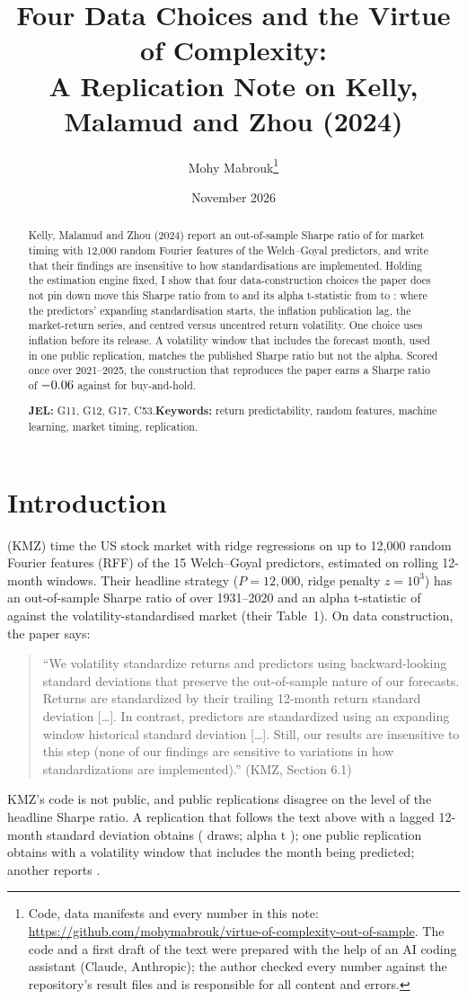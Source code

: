 \documentclass[11pt]{article}
\title{Four Data Choices and the Virtue of Complexity:\\ A Replication Note on Kelly, Malamud and Zhou (2024)}
\author{Mohy Mabrouk\thanks{Code, data manifests and every number in this note:
\url{https://github.com/mohymabrouk/virtue-of-complexity-out-of-sample}. The code and a first draft of the text were
prepared with the help of an AI coding assistant (Claude, Anthropic); the author checked every number against the
repository's result files and is responsible for all content and errors.}}
\date{November 2026}
\begin{document}
\maketitle

\begin{abstract}
\noindent Kelly, Malamud and Zhou (2024) report an out-of-sample Sharpe ratio of \nKmzSR{} for market timing
with 12{,}000 random Fourier features of the Welch--Goyal predictors, and write that their findings are insensitive
to how standardisations are implemented. Holding the estimation engine fixed, I show that four data-construction
choices the paper does not pin down move this Sharpe ratio from \nAInSR{} to \nBInSR{} and its alpha t-statistic
from \nAInT{} to \nBInT: where the predictors' expanding standardisation starts, the inflation publication lag, the
market-return series, and centred versus uncentred return volatility. One choice uses inflation before its
release. A volatility window that includes the forecast month, used in one public replication, matches the
published Sharpe ratio but not the alpha. Scored once over 2021--2025, the construction that reproduces the paper
earns a Sharpe ratio of $-0.06$ against \nBPostBH{} for buy-and-hold.

\medskip
\noindent\textbf{JEL:} G11, G12, G17, C53.\quad \textbf{Keywords:} return predictability, random features,
machine learning, market timing, replication.
\end{abstract}

\section{Introduction}

\citet{kmz2024} (KMZ) time the US stock market with ridge regressions on up to 12{,}000 random Fourier features
(RFF) of the 15 Welch--Goyal predictors, estimated on rolling 12-month windows. Their headline strategy
($P = 12{,}000$, ridge penalty $z = 10^3$) has an out-of-sample Sharpe ratio of \nKmzSR{} over 1931--2020 and an
alpha t-statistic of \nKmzT{} against the volatility-standardised market (their Table~1). On data construction,
the paper says:
\begin{quote}
\small ``We volatility standardize returns and predictors using backward-looking standard deviations that preserve
the out-of-sample nature of our forecasts. Returns are standardized by their trailing 12-month return standard
deviation [\dots]. In contrast, predictors are standardized using an expanding window historical standard deviation
[\dots]. Still, our results are insensitive to this step (none of our findings are sensitive to variations in how
standardizations are implemented).'' (KMZ, Section 6.1)
\end{quote}
KMZ's code is not public, and public replications disagree on the level of the headline Sharpe ratio. A
replication that follows the text above with a lagged 12-month standard deviation \citep{thisrepo} obtains
\nRepSR{} (\nRepDraws{} draws; alpha t \nRepT); one public replication \citep{nkonts} obtains \nNkSR{} with a
volatility window that includes the month being predicted; another \citep{rrikrv} reports \nRrSR.
\end{document}
